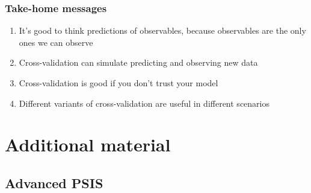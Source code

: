 \documentclass[10pt]{beamer}
\begin{document}
\begin{frame}{}

\frametitle{Take-home messages}

  \begin{enumerate}
  \item It's good to think predictions of observables, because
    observables are the only ones we can observe
  \item {}Cross-validation can simulate predicting and observing new
    data
  \item {}Cross-validation is good if you don't
    trust your model
  \item {}Different variants of cross-validation
    are useful in different scenarios
  \end{enumerate}

\end{frame}





\section{Additional material}
\frame{\sectionpage}
\subsection{Advanced PSIS}
\end{document}
